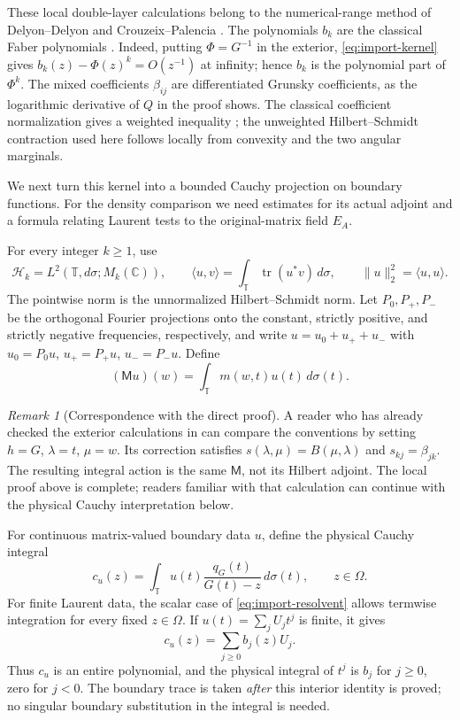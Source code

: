 \documentclass[11pt]{article}
\newcommand{\C}{\mathbb C}
\newcommand{\T}{\mathbb T}
\newcommand{\cH}{\mathcal H}
\newcommand{\M}{\mathsf M}
\DeclareMathOperator{\tr}{tr}
\theoremstyle{definition}
\theoremstyle{remark}
\newtheorem{remark}[theorem]{Remark}
\numberwithin{equation}{section}
\begin{document}
These local double-layer calculations belong to the numerical-range
method of Delyon--Delyon and Crouzeix--Palencia
\cite{DelyonDelyon1999,CrouzeixPalencia2017}.
The polynomials $b_k$ are the classical Faber polynomials
\cite{Beckermann2005,BeckermannCrouzeix2014}. Indeed, putting
$\Phi=G^{-1}$ in the exterior, \eqref{eq:import-kernel} gives
$b_k(z)-\Phi(z)^k=O(z^{-1})$ at infinity; hence $b_k$ is the
polynomial part of $\Phi^k$. The mixed coefficients $\beta_{ij}$ are
differentiated Grunsky coefficients, as the logarithmic derivative of $Q$
in the proof shows. The classical coefficient normalization gives a
weighted inequality \cite[equations (1.1)--(1.3)]{BeckermannStylianopoulos2018};
the unweighted Hilbert--Schmidt contraction used here follows locally
from convexity and the two angular marginals.

We next turn this kernel into a bounded Cauchy projection on boundary
functions. For the density comparison we need estimates for its actual
adjoint and a formula relating Laurent tests to the original-matrix field
$E_A$.

For every integer $k\ge1$, use
\[
 \cH_k=L^2(\T,d\sigma;M_k(\C)),\qquad
 \langle u,v\rangle=\int_\T\tr(u^*v)\,d\sigma,
 \qquad\|u\|_2^2=\langle u,u\rangle.
\]
The pointwise norm is the unnormalized Hilbert--Schmidt norm. Let
$P_0,P_+,P_-$ be the orthogonal Fourier projections onto the constant,
strictly positive, and strictly negative frequencies, respectively, and write
$u=u_0+u_++u_-$ with $u_0=P_0u$, $u_+=P_+u$, $u_-=P_-u$.
Define
\[
 (\M u)(w)=\int_\T m(w,t)u(t)\,d\sigma(t).
\]

\begin{remark}[Correspondence with the direct proof]\label{rem:correspondence}
A reader who has already checked the exterior calculations in
\cite[Theorems~2.1 and~3.1]{Direct} can compare the conventions by setting
$h=G$, $\lambda=t$, $\mu=w$. Its correction satisfies
$s(\lambda,\mu)=B(\mu,\lambda)$ and $s_{kj}=\beta_{jk}$.
The resulting integral action is the same $\M$, not its
Hilbert adjoint. The local proof above is complete; readers familiar with
that calculation can continue with the physical Cauchy interpretation below.
\end{remark}

For continuous matrix-valued boundary data $u$, define the physical
Cauchy integral
\[
 c_u(z)=\int_\T u(t)\frac{q_G(t)}{G(t)-z}\,d\sigma(t),\qquad z\in\Omega.
\]
For finite Laurent data, the scalar case of \eqref{eq:import-resolvent}
allows termwise integration for every fixed $z\in\Omega$.
If $u(t)=\sum_jU_jt^j$ is finite, it gives
\begin{equation}\label{eq:local-bridge}
 c_u(z)=\sum_{j\ge0}b_j(z)U_j.
\end{equation}
Thus $c_u$ is an entire polynomial, and the physical integral of $t^j$
is $b_j$ for $j\ge0$, zero for $j<0$. The boundary trace is taken
\emph{after} this interior identity is proved; no singular boundary
substitution in the integral is needed.
\end{document}
